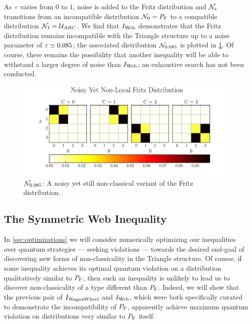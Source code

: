\documentclass[aps, 10pt, english, twoside, pra, nofootinbib, tightenlines, longbibliography, superscriptaddress]{revtex4-1}
\begin{document}
    As $\varepsilon$ varies from $0$ to $1$, noise is added to the Fritz distribution and $\mathcal{N}_{\varepsilon}$ transitions from an incompatible distribution $\s{N}_{0} = \prob[\fritz]$ to a compatible distribution $\mathcal{N}_{1} = \mathcal{U}_{ABC}$. We find that $I_\text{Web}$ demonstrates that the Fritz distribution remains incompatible with the Triangle structure up to a noise parameter of $\varepsilon \simeq 0.085$; the associated distribution $\mathcal{N}_{0.085}$ is plotted in \cref{fig:noisy_fritz}. Of course, there remains the possibility that another inequality will be able to withstand a larger degree of noise than $I_\text{Web}$; an exhaustive search has not been conducted.

    \begin{figure}
    \begin{nscenter}
            \includegraphics{figure_noisy_yet_non_local_fritz.pdf}
            \caption{$\mathcal{N}_{0.085}$: A noisy yet still non-classical variant of the Fritz distribution.}
            \label{fig:noisy_fritz}
    \end{nscenter}
    \end{figure}

    \subsection{The Symmetric Web Inequality}
    In \cref{sec:optimizations} we will consider numerically optimizing our inequalities over quantum strategies --- seeking violations --- towards the desired end-goal of discovering new forms of non-classicality in the Triangle structure. Of course, if some inequality achieves its optimal quantum violation on a distribution qualitatively similar to $\prob[\fritz]$, then such an inequality is unlikely to lead us to discover non-classicality of a type different than $\prob[\fritz]$. Indeed, we will show that the previous pair of $I_\text{WagonWheel}$ and $I_\text{Web}$, which were both specifically curated to demonstrate the incompatibility of $\prob[\fritz]$, apparently achieve maximum quantum violation on distributions very similar to $\prob[\fritz]$ itself.
\end{document}
